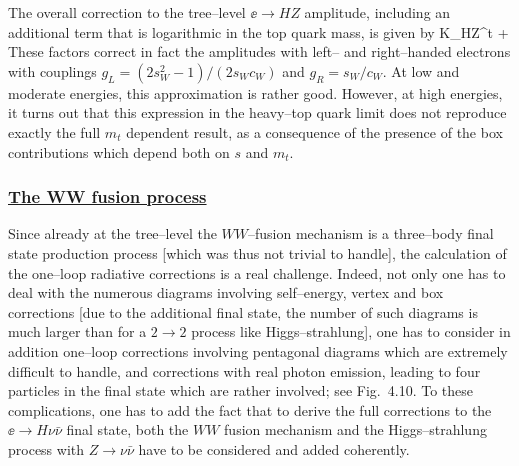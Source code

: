 The overall correction to the tree--level $\ee \to HZ$ amplitude,  including
an additional term that is logarithmic in the top quark mass, is given by
\cite{RCreviewEW}
\beq
K_{\ee \to HZ}^t  +  
\eeq
These factors correct in fact the amplitudes with left-- and right--handed
electrons with couplings $g_{L}=(2s_W^2- 1)/(2s_W c_W)$ and $g_R= s_W/c_W$. 
At low and moderate energies, this approximation is rather good. However, at
high energies, it turns out that this expression in the heavy--top quark limit 
does not reproduce exactly the full $m_t$ dependent result, as a consequence 
of the presence of the box contributions  which depend both on $s$ and $m_t$.

\subsubsection*{\underline{The WW fusion process}}

Since already at the tree--level the $WW$--fusion mechanism is a three--body
final state production process [which was thus not trivial to handle], the
calculation of the one--loop radiative corrections is a real challenge. 
Indeed, not only one has to deal with the numerous diagrams involving
self--energy, vertex and box corrections [due to the additional final state,
the number of such diagrams is much larger than for a $2\to 2$ process like
Higgs--strahlung], one has to consider in addition one--loop corrections
involving pentagonal diagrams which are extremely difficult to handle, and
corrections with real photon emission, leading to four particles in the final
state which are rather involved; see Fig.~4.10. To these complications, one has
to add the fact that to derive the full corrections to the $\ee \to H\nu
\bar{\nu}$ final state, both the $WW$ fusion mechanism and the Higgs--strahlung
process with $Z \to \nu \bar{\nu}$ have to be considered and added coherently.

